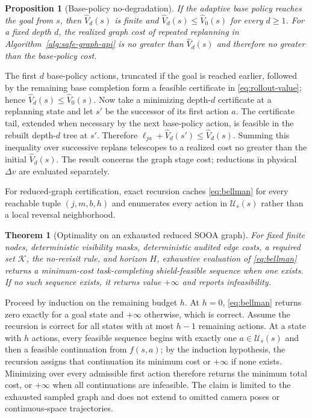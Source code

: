 \documentclass{IEEEtaes}
\newtheorem{theorem}{Theorem}
\newtheorem{proposition}{Proposition}
\theoremstyle{remark}
\theoremstyle{plain}
\begin{document}
\begin{proposition}[Base-policy no-degradation]
\label{prop:base-bound}
If the adaptive base policy reaches the goal from $s$, then $\widehat V_d(s)$ is finite and $\widehat V_d(s)\le\widehat V_0(s)$ for every $d\ge1$. For a fixed depth $d$, the realized graph cost of repeated replanning in Algorithm~\ref{alg:safe-graph-api} is no greater than $\widehat V_d(s)$ and therefore no greater than the base-policy cost.
\end{proposition}

\begin{IEEEproof}
The first $d$ base-policy actions, truncated if the goal is reached earlier, followed by the remaining base completion form a feasible certificate in \eqref{eq:rollout-value}; hence $\widehat V_d(s)\le\widehat V_0(s)$. Now take a minimizing depth-$d$ certificate at a replanning state and let $s'$ be the successor of its first action $a$. The certificate tail, extended when necessary by the next base-policy action, is feasible in the rebuilt depth-$d$ tree at $s'$. Therefore $\ell_{ja}+\widehat V_d(s')\le\widehat V_d(s)$. Summing this inequality over successive replans telescopes to a realized cost no greater than the initial $\widehat V_d(s)$. The result concerns the graph stage cost; reductions in physical $\Delta v$ are evaluated separately.
\end{IEEEproof}

For reduced-graph certification, exact recursion caches \eqref{eq:bellman} for every reachable tuple $(j,m,b,h)$ and enumerates every action in $\mathcal U_s(s)$ rather than a local reversal neighborhood.

\begin{theorem}[Optimality on an exhausted reduced SOOA graph]
\label{thm:reduced-optimality}
For fixed finite nodes, deterministic visibility masks, deterministic audited edge costs, a required set $\mathcal K$, the no-revisit rule, and horizon $H$, exhaustive evaluation of \eqref{eq:bellman} returns a minimum-cost task-completing shield-feasible sequence when one exists. If no such sequence exists, it returns value $+\infty$ and reports infeasibility.
\end{theorem}

\begin{IEEEproof}
Proceed by induction on the remaining budget $h$. At $h=0$, \eqref{eq:bellman} returns zero exactly for a goal state and $+\infty$ otherwise, which is correct. Assume the recursion is correct for all states with at most $h-1$ remaining actions. At a state with $h$ actions, every feasible sequence begins with exactly one $a\in\mathcal U_s(s)$ and then a feasible continuation from $f(s,a)$; by the induction hypothesis, the recursion assigns that continuation its minimum cost or $+\infty$ if none exists. Minimizing over every admissible first action therefore returns the minimum total cost, or $+\infty$ when all continuations are infeasible. The claim is limited to the exhausted sampled graph and does not extend to omitted camera poses or continuous-space trajectories.
\end{IEEEproof}
\end{document}
